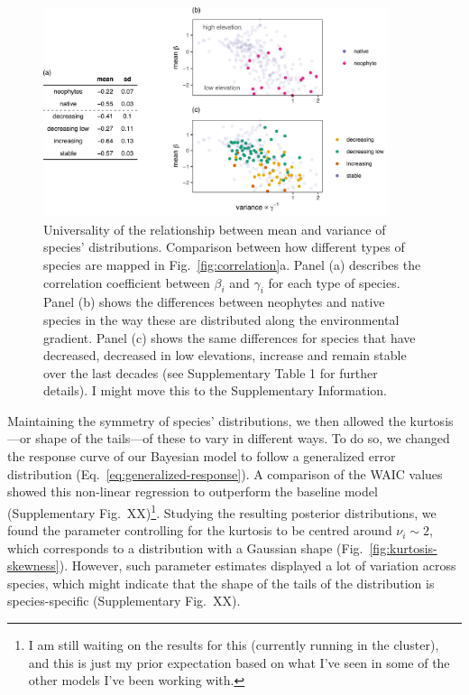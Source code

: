 \documentclass[11pt, a4paper]{article}
\begin{document}
\begin{figure}[ht]
  \centering
    \vspace{0.5cm}
    \includegraphics[width=0.9\textwidth]{figures/means-Rapopor}
    	  \vspace{0.3cm}
	   \caption{Universality of the relationship between mean and variance of species' distributions. Comparison between how different types of species are mapped in Fig.~\ref{fig:correlation}a. Panel (a) describes the correlation coefficient between $\beta_i$ and $\gamma_i$ for each type of species. Panel (b) shows the differences between neophytes and native species in the way these are distributed along the environmental gradient. Panel (c) shows the same differences for species that have decreased, decreased in low elevations, increase and remain stable over the last decades (see Supplementary Table 1 for further details). {\color{red} I might move this to the Supplementary Information.}}
      \label{fig:universality}
\end{figure}

Maintaining the symmetry of species' distributions, we then allowed the kurtosis---or shape of the tails---of these to vary in different ways. To do so, we changed the response curve of our Bayesian model to follow a generalized error distribution (Eq.~\ref{eq:generalized-response}). A comparison of the WAIC values showed this non-linear regression to outperform the baseline model (Supplementary Fig.~XX)\footnote[2]{\label{note1} I am still waiting on the results for this (currently running in the cluster), and this is just my prior expectation based on what I've seen in some of the other models I've been working with.}. Studying the resulting posterior distributions, we found the parameter controlling for the kurtosis to be centred around $\nu_i \sim 2$, which corresponds to a distribution with a Gaussian shape (Fig.~\ref{fig:kurtosis-skewness}). However, such parameter estimates displayed a lot of variation across species, which might indicate that the shape of the tails of the distribution is species-specific (Supplementary Fig.~XX).
\end{document}
